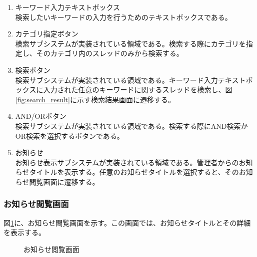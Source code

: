\documentclass[a4j]{jarticle}
\begin{document}
\begin{enumerate}
  \renewcommand{\labelenumi}{\textcircled{\scriptsize \theenumi}}

  \item キーワード入力テキストボックス\\
  検索したいキーワードの入力を行うためのテキストボックスである。
  \item カテゴリ指定ボタン\\
  検索サブシステムが実装されている領域である。検索する際にカテゴリを指定し、そのカテゴリ内のスレッドのみから検索する。
  \item 検索ボタン\\
  検索サブシステムが実装されている領域である。キーワード入力テキストボックスに入力された任意のキーワードに関するスレッドを検索し、図\ref{fig:search_result}に示す検索結果画面に遷移する。
  \item AND/ORボタン\\
  検索サブシステムが実装されている領域である。検索する際にAND検索かOR検索を選択するボタンである。
  \item お知らせ\\
  お知らせ表示サブシステムが実装されている領域である。管理者からのお知らせタイトルを表示する。任意のお知らせタイトルを選択すると、そのお知らせ閲覧画面に遷移する。
\end{enumerate}

\subsubsection{お知らせ閲覧画面}
図\ref{fig:read_news}に、お知らせ閲覧画面を示す。この画面では、お知らせタイトルとその詳細を表示する。
\begin{figure}[H]
\centering
{}
\caption{お知らせ閲覧画面}
\label{fig:read_news}
\end{figure}
\end{document}

